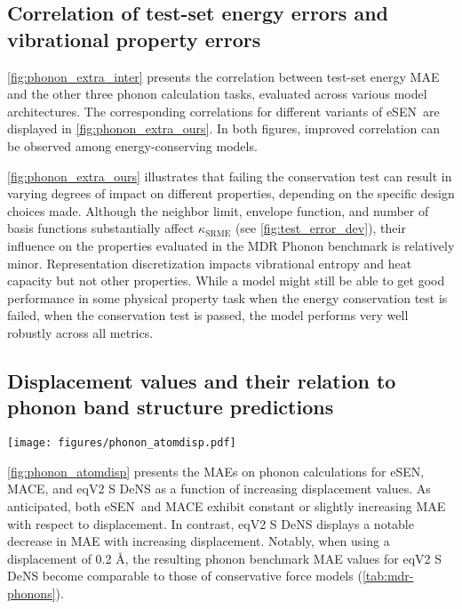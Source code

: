 \documentclass[twocolumn]{fairmeta}
\newcommand{\ourmodel}{eSEN}
\begin{document}
\subsection{Correlation of test-set energy errors and vibrational property errors}

\cref{fig:phonon_extra_inter} presents the correlation between test-set energy MAE and the other three phonon calculation tasks, evaluated across various model architectures. The corresponding correlations for different variants of \ourmodel~are displayed in \cref{fig:phonon_extra_ours}. In both figures, improved correlation can be observed among energy-conserving models.

\cref{fig:phonon_extra_ours} illustrates that failing the conservation test can result in varying degrees of impact on different properties, depending on the specific design choices made. Although the neighbor limit, envelope function, and number of basis functions substantially affect $\kappa_{\mathrm{SRME}}$ (see \cref{fig:test_error_dev}), their influence on the properties evaluated in the MDR Phonon benchmark is relatively minor. Representation discretization impacts vibrational entropy and heat capacity but not other properties. While a model might still be able to get good performance in some physical property task when the energy conservation test is failed, when the conservation test is passed, the model performs very well robustly across all metrics. 

\subsection{Displacement values and their relation to phonon band structure predictions}

\begin{figure*}[t]
\texttt{[image: figures/phonon\_atomdisp.pdf]}
\caption{
Errors in a randomly sampled subset (1000 samples) of the MDR Phonon benchmark when the atom displacement is adjusted.
}
\label{fig:phonon_atomdisp}
\end{figure*}

\cref{fig:phonon_atomdisp} presents the MAEs on phonon calculations for \ourmodel, MACE, and eqV2 S DeNS as a function of increasing displacement values. As anticipated, both \ourmodel\ and MACE exhibit constant or slightly increasing MAE with respect to displacement. In contrast, eqV2 S DeNS displays a notable decrease in MAE with increasing displacement. Notably, when using a displacement of 0.2 \AA, the resulting phonon benchmark MAE values for eqV2 S DeNS become comparable to those of conservative force models (\cref{tab:mdr-phonons}). 
\end{document}
